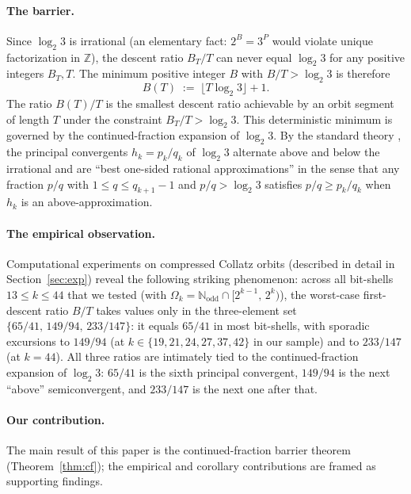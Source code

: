 \documentclass[11pt,a4paper]{article}
\theoremstyle{definition}
\theoremstyle{remark}
\newcommand{\N}{\mathbb{N}}
\newcommand{\Z}{\mathbb{Z}}
\newcommand{\Nodd}{\N_{\mathrm{odd}}}
\begin{document}
\paragraph{The barrier.}
Since $\log_2 3$ is irrational (an elementary fact: $2^B = 3^P$ would
violate unique factorization in $\Z$), the descent ratio $B_T / T$
can never equal $\log_2 3$ for any positive integers $B_T, T$.  The minimum positive integer $B$ with
$B / T > \log_2 3$ is therefore
\[
  B(T) \;:=\; \lfloor T \log_2 3 \rfloor + 1.
\]
The ratio $B(T) / T$ is the smallest descent ratio achievable by an
orbit segment of length $T$ under the constraint
$B_T/T > \log_2 3$.  This deterministic minimum is governed by the
continued-fraction expansion of $\log_2 3$.  By the standard theory
\cite[Ch.~7]{HardyWright}, the principal convergents $h_k = p_k/q_k$
of $\log_2 3$ alternate above and below the irrational and are
``best one-sided rational approximations'' in the sense that any
fraction $p/q$ with $1 \leq q \leq q_{k+1} - 1$ and $p/q > \log_2 3$
satisfies $p/q \geq p_k/q_k$ when $h_k$ is an above-approximation.

\paragraph{The empirical observation.}
Computational experiments on compressed Collatz orbits (described in
detail in Section~\ref{sec:exp}) reveal the following striking
phenomenon: across all bit-shells $13 \leq k \leq 44$ that we tested
(with $\Omega_k = \Nodd \cap [2^{k-1},\, 2^k)$), the worst-case
first-descent ratio $B/T$ takes values only in the three-element set
$\{65/41,\, 149/94,\, 233/147\}$: it equals $65/41$ in most bit-shells,
with sporadic excursions to $149/94$ (at $k \in \{19, 21, 24, 27, 37,
42\}$ in our sample) and to $233/147$ (at $k = 44$).  All three
ratios are intimately tied to the continued-fraction expansion of
$\log_2 3$: $65/41$ is the sixth principal convergent, $149/94$ is the
next ``above'' semiconvergent, and $233/147$ is the next one after
that.

\paragraph{Our contribution.}
The main result of this paper is the continued-fraction barrier
theorem (Theorem~\ref{thm:cf}); the empirical and corollary
contributions are framed as supporting findings.
\end{document}

